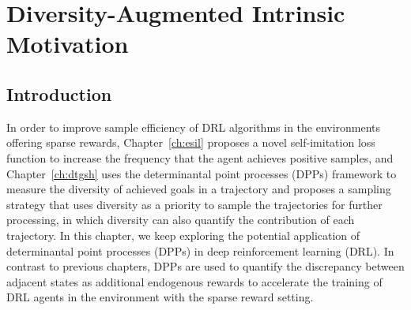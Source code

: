 \newcommand{\ourmethod}{\text{DAIM}}
\newcommand{\policypi}{\mathbf{\pi} }
\newcommand{\expection}{\mathbb{E} }
\newcommand{\tables}{{Table }}
\newcommand{\eq}{{Equation }}
\newcommand{\alg}{{Algorithm }}
\newcommand{\starcraft}{{StarCraft II}}

\chapter{Diversity-Augmented Intrinsic Motivation}
\label{ch:daim}
\section{Introduction}
In order to improve sample efficiency of DRL algorithms in the environments offering sparse rewards, Chapter~\ref{ch:esil} proposes a novel self-imitation loss function to increase the frequency that the agent achieves positive samples, and Chapter~\ref{ch:dtgsh} uses the determinantal point processes (DPPs) framework to measure the diversity of achieved goals in a trajectory and proposes a sampling strategy that uses diversity as a priority to sample the trajectories for further processing, in which diversity can also quantify the contribution of each trajectory. In this chapter, we keep exploring the potential application of determinantal point processes (DPPs) in deep reinforcement learning (DRL). In contrast to previous chapters, DPPs are used to quantify the discrepancy between adjacent states as additional endogenous rewards to accelerate the training of DRL agents in the environment with the sparse reward setting.



